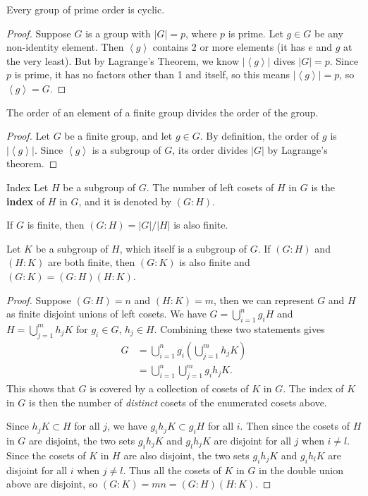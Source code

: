 \documentclass[10pt]{report}
\begin{document}
\begin{cor}
Every group of prime order is cyclic.
\end{cor}
\begin{proof}
	Suppose $G$ is a group with $|G|=p$, where $p$ is prime. Let $g \in G$ be any non-identity element. Then $\left\langle g \right\rangle$ contains 2 or more elements (it has $e$ and $g$ at the very least). But by Lagrange's Theorem, we know $|\left\langle g \right\rangle|$ dives $|G|=p$. Since $p$ is prime, it has no factors other than 1 and itself, so this means $|\left\langle g \right\rangle|=p$, so $\left\langle g \right\rangle=G$.
\end{proof}

\begin{cor}
	The order of an element of a finite group divides the order of the group.
\end{cor}
\begin{proof}
	Let $G$ be a finite group, and let $g \in G$. By definition, the order of $g$ is $|\left\langle g \right\rangle|$. Since $\left\langle g \right\rangle$ is a subgroup of $G$, its order divides $|G|$ by Lagrange's theorem.
\end{proof}

\begin{defn}{Index}{}
	Let $H$ be a subgroup of $G$. The number of left cosets of $H$ in $G$ is the \textbf{index} of $H$ in $G$, and it is denoted by $(G:H)$.
\end{defn}

If $G$ is finite, then $(G:H) = |G|/|H|$ is also finite.

\begin{prop}
	Let $K$ be a subgroup of $H$, which itself is a subgroup of $G$. If $(G:H)$ and $(H:K)$ are both finite, then $(G:K)$ is also finite and $(G:K)=(G:H)(H:K)$.
\end{prop}
\begin{proof}
	Suppose $(G:H)=n$ and $(H:K)=m$, then we can represent $G$ and $H$ as finite disjoint unions of left cosets. We have $G = \bigcup_{i=1}^n g_i H$ and $H = \bigcup_{j=1}^m h_j K$ for $g_i \in G$, $h_j\in H$. Combining these two statements gives
	\begin{align*}
		G &= \bigcup_{i=1}^n g_i \left( \bigcup_{j=1}^m h_j K \right) \\
		  &= \bigcup_{i=1}^n \bigcup_{j=1}^m g_i h_j K.
	\end{align*}
	This shows that $G$ is covered by a collection of cosets of $K$ in $G$. The index of $K$ in $G$ is then the number of \textit{distinct} cosets of the enumerated cosets above.

	Since $h_j K \subset H$ for all $j$, we have $g_i h_j K \subset g_i H$ for all $i$. Then since the cosets of $H$ in $G$ are disjoint, the two sets $g_i h_j K$ and $g_l h_j K$ are disjoint for all $j$ when $i \neq l$. Since the cosets of $K$ in $H$ are also disjoint, the two sets $g_i h_j K$ and $g_i h_l K$ are disjoint for all $i$ when $j \neq l$. Thus all the cosets of $K$ in $G$ in the double union above are disjoint, so $(G:K) = m n = (G:H) (H:K)$.
\end{proof}
\end{document}
